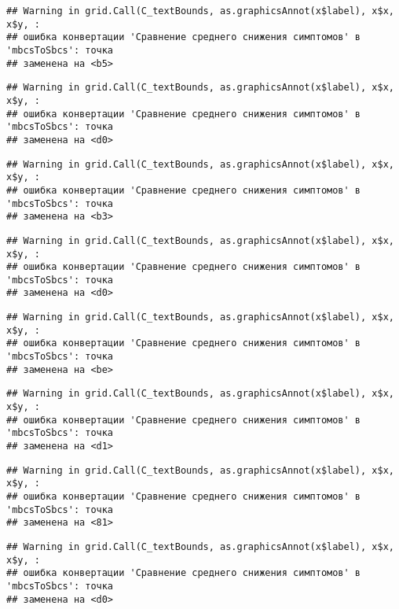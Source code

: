 \documentclass[
]{article}
\begin{document}
\begin{verbatim}
## Warning in grid.Call(C_textBounds, as.graphicsAnnot(x$label), x$x, x$y, :
## ошибка конвертации 'Сравнение среднего снижения симптомов' в 'mbcsToSbcs': точка
## заменена на <b5>
\end{verbatim}

\begin{verbatim}
## Warning in grid.Call(C_textBounds, as.graphicsAnnot(x$label), x$x, x$y, :
## ошибка конвертации 'Сравнение среднего снижения симптомов' в 'mbcsToSbcs': точка
## заменена на <d0>
\end{verbatim}

\begin{verbatim}
## Warning in grid.Call(C_textBounds, as.graphicsAnnot(x$label), x$x, x$y, :
## ошибка конвертации 'Сравнение среднего снижения симптомов' в 'mbcsToSbcs': точка
## заменена на <b3>
\end{verbatim}

\begin{verbatim}
## Warning in grid.Call(C_textBounds, as.graphicsAnnot(x$label), x$x, x$y, :
## ошибка конвертации 'Сравнение среднего снижения симптомов' в 'mbcsToSbcs': точка
## заменена на <d0>
\end{verbatim}

\begin{verbatim}
## Warning in grid.Call(C_textBounds, as.graphicsAnnot(x$label), x$x, x$y, :
## ошибка конвертации 'Сравнение среднего снижения симптомов' в 'mbcsToSbcs': точка
## заменена на <be>
\end{verbatim}

\begin{verbatim}
## Warning in grid.Call(C_textBounds, as.graphicsAnnot(x$label), x$x, x$y, :
## ошибка конвертации 'Сравнение среднего снижения симптомов' в 'mbcsToSbcs': точка
## заменена на <d1>
\end{verbatim}

\begin{verbatim}
## Warning in grid.Call(C_textBounds, as.graphicsAnnot(x$label), x$x, x$y, :
## ошибка конвертации 'Сравнение среднего снижения симптомов' в 'mbcsToSbcs': точка
## заменена на <81>
\end{verbatim}

\begin{verbatim}
## Warning in grid.Call(C_textBounds, as.graphicsAnnot(x$label), x$x, x$y, :
## ошибка конвертации 'Сравнение среднего снижения симптомов' в 'mbcsToSbcs': точка
## заменена на <d0>
\end{verbatim}
\end{document}
